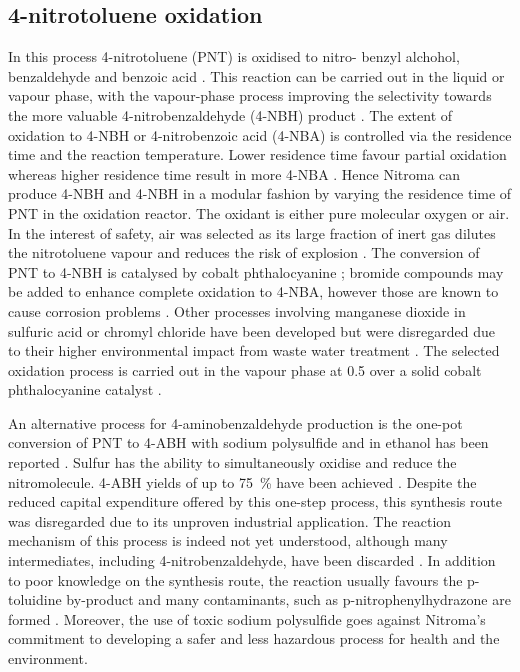 \subsection{4-nitrotoluene oxidation}

In this process 4-nitrotoluene (PNT) is oxidised to nitro- benzyl alchohol, benzaldehyde and benzoic acid \cite{hoorn_modelling_2005}. This reaction can be carried out in the liquid or vapour phase, with the vapour-phase process improving the selectivity towards the more valuable 4-nitrobenzaldehyde (4-NBH) product \cite{bruhne_benzaldehyde_2011}. The extent of oxidation to 4-NBH or 4-nitrobenzoic acid (4-NBA) is controlled via the residence time and the reaction temperature. Lower residence time favour partial oxidation whereas higher residence time result in more 4-NBA \cite{bruhne_benzaldehyde_2011,tan_kinetic_2010}. Hence Nitroma can produce 4-NBH and 4-NBH in a modular fashion by varying the residence time of PNT in the oxidation reactor. The oxidant is either pure molecular oxygen or air. In the interest of safety, air was selected as its large fraction of inert  gas dilutes the nitrotoluene vapour and reduces the risk of explosion \cite{bruhne_benzaldehyde_2011}.  The conversion of PNT to 4-NBH is catalysed by cobalt phthalocyanine \cite{wendt_reaction_1986}; bromide compounds may be added to enhance complete oxidation to 4-NBA, however those are known to cause corrosion problems \cite{opgrande_benzoic_2003}. Other processes involving manganese dioxide in sulfuric acid or chromyl chloride have been developed but were disregarded due to their higher environmental impact from waste water treatment \cite{bruhne_benzaldehyde_2011}. The selected oxidation process is carried out in the vapour phase at \SI{0.5}{\atm} over a solid cobalt phthalocyanine catalyst \cite{chandalia_kinetics_1999}. 

An alternative process for 4-aminobenzaldehyde production is the one-pot conversion of PNT to 4-ABH with sodium polysulfide and  in ethanol has been reported \cite{ogata_mechanism_1979}. Sulfur has the ability to simultaneously oxidise and reduce the nitromolecule. 4-ABH yields of up to \SI{75}{\percent} have been achieved \cite{beard_preparation_1944}. Despite the reduced capital expenditure offered by this one-step process, this synthesis route was disregarded due to its unproven industrial application. The reaction mechanism of this process is indeed not yet understood, although many intermediates, including 4-nitrobenzaldehyde, have been discarded \cite{ogata_mechanism_1979}. In addition to poor knowledge on the synthesis route, the reaction usually favours the p-toluidine by-product and many contaminants, such as p-nitrophenylhydrazone are formed \cite{beard_preparation_1944}. Moreover, the use of toxic sodium polysulfide goes against Nitroma's commitment to developing a safer and less hazardous process for health and the environment.

